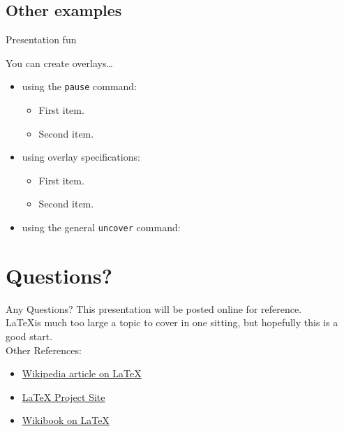 \documentclass{beamer}
\begin{document}
\subsection{Other examples}
\begin{frame}{Presentation fun}

  You can create overlays\dots
  \begin{itemize}
  \item using the \texttt{pause} command:
    \begin{itemize}
    \item
      First item.
      \pause
    \item    
      Second item.
    \end{itemize}
  \item
    using overlay specifications:
    \begin{itemize}
    \item<3->
      First item.
    \item<4->
      Second item.
    \end{itemize}
  \item
    using the general \texttt{uncover} command:
    \begin{itemize}
    \end{itemize}
  \end{itemize}
\end{frame}


\section*{Questions?}

\begin{frame}{Any Questions?}
  This presentation will be posted online for reference.\\
  
  \LaTeX is much too large a topic to cover in one sitting, but hopefully this is a good start.\\
  
  Other References:
  \begin{itemize}
    \item \href{http://en.wikipedia.org/wiki/LaTeX}{Wikipedia article on \LaTeX}
    \item \href{http://www.latex-project.org/}{\LaTeX{ }Project Site}
    \item \href{http://en.wikibooks.org/wiki/LaTeX/}{Wikibook on \LaTeX}
  \end{itemize}
\end{frame}
\end{document}
